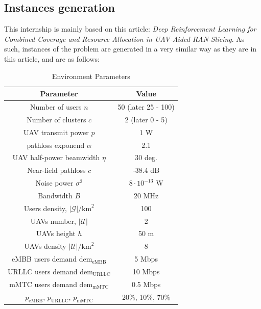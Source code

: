 \documentclass[letterpaper]{article}
\begin{document}
\subsection{Instances generation}

This internship is mainly based on this article: \textit{Deep Reinforcement Learning for Combined Coverage and Resource Allocation in UAV-Aided RAN-Slicing}\cite{main_article}.
As such, instances of the problem are generated in a very similar way as they are in this article, and are as follows:

\begin{table}[H]
    \centering
    \begin{tabular}{|c|c|}
    \hline
    Parameter & Value \\
    \hline
        Number of users $n$ & 50 (later 25 - 100)\\
        Number of clusters $c$ & 2 (later 0 - 5) \\
        UAV transmit power $p$ &  1 W\\
        pathloss exponend $\alpha$ & 2.1 \cite{Channel_Model}\\
        UAV half-power beamwidth $\eta$ & 30 deg. \cite{Channel_Model}\\
        Near-field pathloss $c$ & -38.4 dB \cite{Channel_Model}\\
        Noise power $\sigma^2$ & $8 \cdot 10^{-13}$ W\\
        Bandwidth $B$ & 20 MHz\\
        Users density, $|\mathcal{G}|/\text{km}^2$ & 100\\
        UAVs number, $|\mathcal{U}|$ & 2\\
        UAVs height $h$ & 50 m\\
        UAVs density $|\mathcal{U}|/\text{km}^2$ & 8\\
        eMBB users demand $\text{dem}_\text{eMBB}$ & 5 Mbps \cite{demandsvalues}\\
        URLLC users demand $\text{dem}_\text{URLLC}$ & 10 Mbps \cite{demandsvalues}\\
        mMTC users demand $\text{dem}_\text{mMTC}$ & 0.5 Mbps \cite{demandsvalues}\\
        $p_{\text{eMBB}}$, $p_{\text{URLLC}}$, $p_{\text{mMTC}}$ & 20\%, 10\%, 70\% \\
    \hline
    \end{tabular}
    \caption{Environment Parameters}
    \label{tab:envparams}
\end{table}
\end{document}
